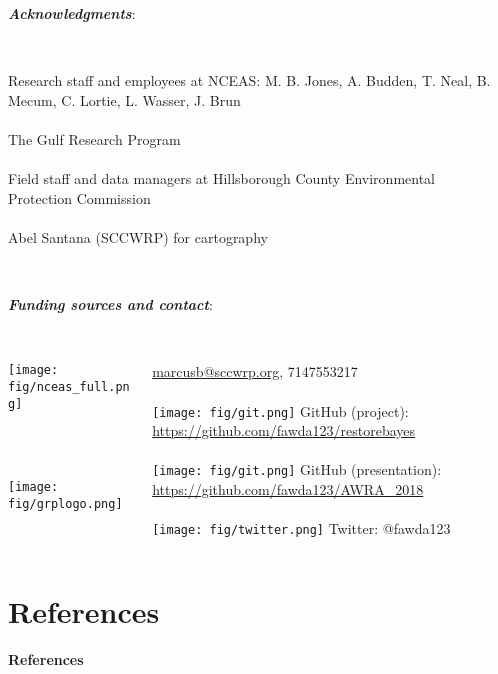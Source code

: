 \documentclass[serif]{beamer}\usepackage[]{graphicx}\usepackage[]{color}
\newcommand{\emtxt}[1]{\textbf{\textit{{\color{mypal4} #1}}}}
\begin{document}
\begin{frame}
\emtxt{Acknowledgments}:\\~\\
\begin{columns}
\begin{column}{0.8\textwidth}
{\footnotesize
Research staff and employees at NCEAS: M. B. Jones, A. Budden, T. Neal, B. Mecum, C. Lortie, L. Wasser, J. Brun  \\~\\
The Gulf Research Program \\~\\
Field staff and data managers at Hillsborough County Environmental Protection Commission\\~\\
Abel Santana (SCCWRP) for cartography\\~\\}
\end{column}
\begin{column}{0.2\textwidth}
\end{column}
\end{columns}
\vfill
\emtxt{Funding sources and contact}:\\~\\
\begin{columns}
\begin{column}{0.5\textwidth}
\centerline{\texttt{[image: fig/nceas\_full.png]}}\\~\\
\vspace{0.15in}
\centerline{\texttt{[image: fig/grplogo.png]}}
\end{column}
\begin{column}{0.5\textwidth}
\scriptsize
\href{mailto:marcusb@sccwrp.org}{marcusb@sccwrp.org}, 7147553217\\~\\
\texttt{[image: fig/git.png]} GitHub (project): \href{https://github.com/fawda123/restorebayes}{https://github.com/fawda123/restorebayes}\\~\\
\texttt{[image: fig/git.png]} GitHub (presentation): \href{https://github.com/fawda123/AWRA_2018}{https://github.com/fawda123/AWRA\_2018}\\~\\
\texttt{[image: fig/twitter.png]} Twitter: @fawda123
\end{column}
\end{columns}
\vspace{0.2in}
\end{frame}


\section{References}
\begin{frame}[t,shrink]{\textbf{References}}
\tiny
{}


\end{frame}
\end{document}
